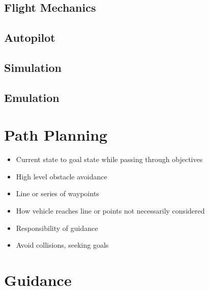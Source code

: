 \documentclass[numbered,pdftex]{ohio-etd}
\begin{document}
\subsection{Flight Mechanics}
\subsection{Autopilot}
\subsection{Simulation}
\subsection{Emulation}

\section{Path Planning}
\begin{itemize}

\item Current state to goal state while passing through objectives
\item High level obstacle avoidance
\item Line or series of waypoints
\item How vehicle reaches line or points not necessarily considered
\item Responsibility of guidance
\item Avoid collisions, seeking goals
\end{itemize}

\section{Guidance}
\end{document}
